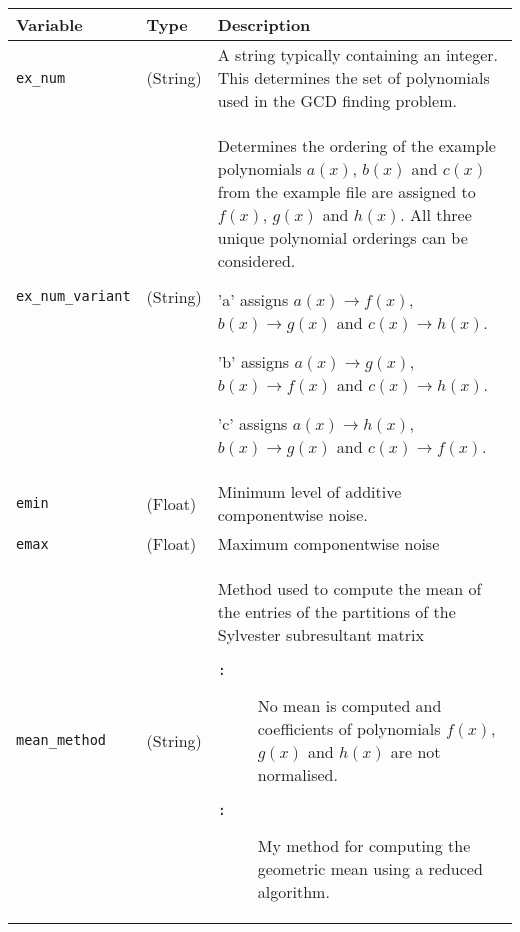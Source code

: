 \documentclass{article}
\begin{document}
\begin{longtable}[c]{|p{14em}||p{5em}|p{25em}|}
			\hline
			Variable
		&	Type
		&	Description
		\\
			\hline
			\texttt{ex\_num}
		&	(String)
		&	A string typically containing an integer. This determines the set of polynomials used in the GCD finding problem.
		\\
			\hline
			\texttt{ex\_num\_variant}
		&	(String)
		&	Determines the ordering of the example polynomials $a(x)$, $b(x)$ and $c(x)$ from the example file are assigned to $f(x)$, $g(x)$ and $h(x)$. All three unique polynomial orderings can be considered.
		
		\begin{description}

			\item 'a' assigns 
			$a(x) \rightarrow f(x)$, 
			$b(x) \rightarrow g(x)$ and 
			$c(x) \rightarrow h(x)$.
			
			\item 'b' assigns 
			$a(x) \rightarrow g(x)$,
			$b(x) \rightarrow f(x)$ and
			$c(x) \rightarrow h(x)$.
			
			\item 'c' assigns
			$a(x) \rightarrow h(x)$,
			$b(x) \rightarrow g(x)$ and
			$c(x) \rightarrow f(x)$.
			
		\end{description}
		\\
			\hline
			\texttt{emin}
		&	(Float)
		&	Minimum level of additive componentwise noise.
		\\
			\hline
			\texttt{emax}
		&	(Float)
		&	Maximum componentwise noise
		\\
			\hline
			\texttt{mean\_method}
		&	(String)
		&	Method used to compute the mean of the entries of the partitions of the Sylvester subresultant matrix
			\begin{description}
				\item[\texttt{None} : ] 
				No mean is computed and coefficients of polynomials $f(x)$, $g(x)$ and $h(x)$ are not normalised.
				
				\item[\texttt{Geometric Mean My Method} : ] My method for computing the geometric mean using a reduced algorithm.
				

\end{description}
\end{longtable}
\end{document}
